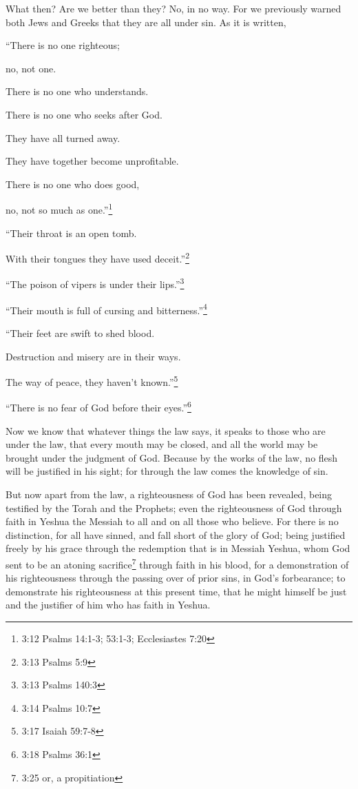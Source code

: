 \myverse{}What then? Are we better than they? No, in no way. For we previously
warned both Jews and Greeks that they are all under sin.
\myverse{}As it is written,

“There is no one righteous;

no, not one.

\myverse{}There is no one who understands.

There is no one who seeks after God.

\myverse{}They have all turned away.

They have together become unprofitable.

There is no one who does good,

no, not so much as one.”\footnote{3:12 Psalms 14:1-3;
	53:1-3;
	Ecclesiastes 7:20}

\myverse{}“Their throat is an open tomb.

With their tongues they have used deceit.”\footnote{3:13 Psalms 5:9}

“The poison of vipers is under their lips.”\footnote{3:13 Psalms 140:3}

\myverse{}“Their mouth is full of cursing and bitterness.”\footnote{3:14 Psalms 10:7}

\myverse{}“Their feet are swift to shed blood.

\myverse{}Destruction and misery are in their ways.

\myverse{}The way of peace, they haven’t known.”\footnote{3:17 Isaiah 59:7-8}

\myverse{}“There is no fear of God before their eyes.”\footnote{3:18 Psalms 36:1}

\myverse{}Now we know that whatever things the law says, it speaks to those
who are under the law, that every mouth may be closed, and all the world may be brought under the judgment
of God.
\myverse{}Because by the works of the law, no flesh will be justified in his sight;
for through the law comes the knowledge of sin.

\myverse{}But now apart from the law, a righteousness of God has been revealed,
being testified by the Torah and the Prophets;
\myverse{}even the righteousness of God through faith in Yeshua the Messiah to all and
on all those who believe. For there is no distinction,
\myverse{}for all have sinned, and fall short of the glory of God;
\myverse{}being justified freely by his grace through the redemption that is in Messiah
Yeshua,
\myverse{}whom God sent to be an atoning sacrifice\footnote{3:25 or, a propitiation} through faith in his blood, for a demonstration of his righteousness
through the passing over of prior sins, in God’s forbearance;
\myverse{}to demonstrate his righteousness at this present time, that he might himself
be just and the justifier of him who has faith in Yeshua.

